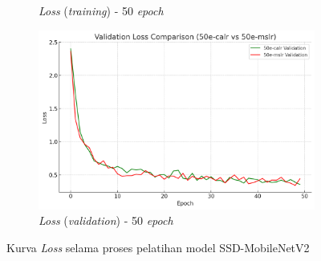 \begin{figure}[htbp]
\begin{subfigure}{0.45\textwidth}
    \caption{\emph{Loss} (\emph{training}) - 50 \emph{epoch}}
  \end{subfigure}
  \hfill
  \begin{subfigure}{0.45\textwidth}
    \includegraphics[width=\textwidth]{gambar/bab4-val-loss-50e.png}
    \caption{\emph{Loss} (\emph{validation}) - 50 \emph{epoch}}
  \end{subfigure}
  \caption{Kurva \emph{Loss} selama proses pelatihan model SSD-MobileNetV2}
  \label{fig:loss_curves}
\end{figure}

